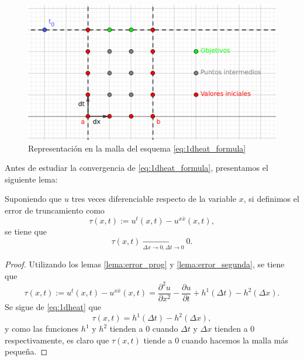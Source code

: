\begin{figure}[h]
	\centering
	\includegraphics[scale=0.25]{./Imagenes/Bitmap/1dheatpoints.png}
	\caption{Representación en la malla del esquema \eqref{eq:1dheat_formula}}
	\label{fig:1d_grid}
\end{figure}

Antes de estudiar la convergencia de \eqref{eq:1dheat_formula}, presentamos el siguiente lema:

\begin{lema}\label{lema:1dheat}
	Suponiendo que $u$ tres veces diferenciable respecto de la variable $x$, si definimos el error de truncamiento como
	\begin{equation}
		\label{eq:lema1_eq1}
		\tau(x,t):= u^t(x,t)-u^{x\bar{x}}(x,t),
	\end{equation}
	se tiene que
	\begin{equation}
		\tau(x,t) \xrightarrow[\Delta x \rightarrow 0, \Delta t\rightarrow 0]{} 0.
	\end{equation}
	
\end{lema}

\begin{proof}
	Utilizando los lemas \ref{lema:error_prog} y \ref{lema:error_segunda}, se tiene que
	\begin{equation}
		\tau(x,t) := u^{t}(x,t) - u^{x\bar{x}}(x,t) = \frac{\partial^2u}{\partial x^2} - \frac{\partial u}{\partial t} + h^1(\Delta t) - h^2(\Delta x).
	\end{equation}
	Se sigue de \eqref{eq:1dheat} que
	\begin{equation}
		\tau(x,t) = h^1(\Delta t) - h^2(\Delta x),
	\end{equation}
	y como las funciones $h^1$ y $h^2$ tienden a 0 cuando $\Delta t$ y $\Delta x$ tienden a 0 respectivamente, es claro que $\tau(x,t)$ tiende a 0 cuando hacemos la malla más pequeña.
\end{proof}

